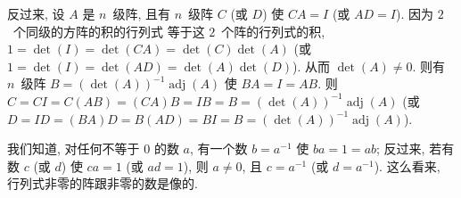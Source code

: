 \documentclass[../libro.tex]{subfiles}
\begin{document}
反过来, 设 \(A\) 是 \(n\)~级阵,
且有 \(n\)~级阵 \(C\) (或 \(D\))
使 \(CA = I\) (或 \(AD = I\)).
因为 \(2\)~个同级的方阵的积的行列式%
等于这 \(2\)~个阵的行列式的积,
\(1 = \det {(I)} = \det {(CA)} = \det {(C)} \det {(A)}\)
(或 \(1 = \det {(I)} = \det {(AD)} = \det {(A)} \det {(D)}\)).
从而 \(\det {(A)} \neq 0\).
则有 \(n\)~级阵
\(B = (\det {(A)})^{-1} \operatorname{adj} {(A)}\)
使 \(BA = I = AB\).
则 \(C = CI = C(AB) = (CA)B = IB = B
= (\det {(A)})^{-1} \operatorname{adj} {(A)}\)
(或 \(D = ID = (BA)D = B(AD) = BI = B
= (\det {(A)})^{-1} \operatorname{adj} {(A)}\)).

我们知道, 对任何不等于 \(0\) 的数 \(a\),
有一个数 \(b = a^{-1}\) 使 \(ba = 1 = ab\);
反过来, 若有数 \(c\) (或 \(d\))
使 \(ca = 1\) (或 \(ad = 1\)),
则 \(a \neq 0\),
且 \(c = a^{-1}\) (或 \(d = a^{-1}\)).
这么看来,
行列式非零的阵跟非零的数是像的.
\end{document}
